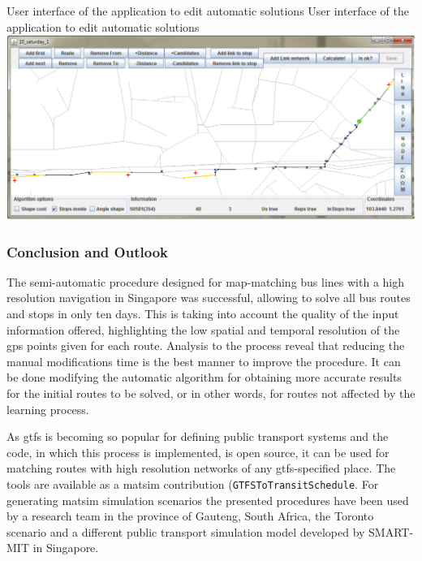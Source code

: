 \createfigure
{User interface of the application to edit automatic solutions}
{User interface of the application to edit automatic solutions}
{\label{fig:Application}}
{\includegraphics[width=1.0\textwidth]{extending/figures/semiAuto/Application.png}}
{}

\subsubsection{Conclusion and Outlook}
The semi-automatic procedure designed for map-matching bus lines with a high resolution navigation in Singapore was successful, allowing to solve all bus routes and stops in only ten days. This is taking into account the quality of the input information offered, highlighting the low spatial and temporal resolution of the \gls{gps} points given for each route. Analysis to the process reveal that reducing the manual modifications time is the best manner to improve the procedure. It can be done modifying the automatic algorithm for obtaining more accurate results for the initial routes to be solved, or in other words, for routes not affected by the learning process.

As \gls{gtfs} is becoming so popular for defining public transport systems and the code, in which this process is implemented, is open source, it can be used for matching routes with high resolution networks of any \gls{gtfs}-specified place. The tools are available as a \gls{matsim} \gls{contribution} (\lstinline|GTFSToTransitSchedule|. For generating \gls{matsim} simulation scenarios the presented procedures have been used by a research team in the province of Gauteng, South Africa, the Toronto scenario and a different public transport simulation model developed by SMART-MIT in Singapore.

